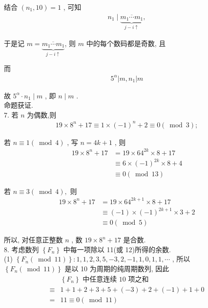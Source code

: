 结合 $\left(n_{1}, 10\right)=1$ , 可知
\begin{align*}
	n_{1} \mid \underbrace{\overline{m_{1} \cdots m_{1}}}_{j-i \uparrow},
\end{align*}

于是记 $m=\underbrace{\overline{m_{1} \cdots m_{1}}}_{j-i \uparrow}$, 则 $m$ 中的每个数码都是奇数, 且

而
\begin{align*}
	5^{\alpha}\left|m, n_{1}\right| m
\end{align*}

故 $5^{\alpha} \cdot n_{1} \mid m$ , 即 $n \mid m$ . \\
命题获证. \\
7. 若 $n$ 为偶数,则
\begin{align*}
	19 \times 8^{n}+17 \equiv 1 \times(-1)^{n}+2 \equiv 0(\bmod 3) ;
\end{align*}

若 $n \equiv 1(\bmod 4)$ , 写 $n=4 k+1$ , 则\begin{align}
	19 \times 8^{n}+17 & =19 \times 64^{2 k} \times 8+17      \\
	                   & \equiv 6 \times(-1)^{2 k} \times 8+4 \\
	                   & \equiv 0(\bmod 13)
\end{align}

若 $n \equiv 3(\bmod 4) , $ 则\begin{align}
	19 \times 8^{n}+17 & =19 \times 64^{2 k+1} \times 8+17        \\
	                   & \equiv(-1) \times(-1)^{2 k+1} \times 3+2 \\
	                   & \equiv 0(\bmod 5)
\end{align}

所以, 对任意正整数 $n$ , 数 $19 \times 8^{n}+17$ 是合数.\\
8. 考虑数列 $\left\{F_{n}\right\}$ 中每一项除以 11(或 12)所得的余数. \\
(1) $\left\{F_{n}(\bmod 11)\right\}: 1,1,2,3,5,-3,2,-1,1,0,1,1, \cdots$ , 所以 $\left\{F_{n}(\bmod 11)\right\}$ 是以 10 为周期的纯周期数列, 因此\begin{align}
	       & \left\{F_{n}\right\} \text { 中任意连续 } 10 \text { 项之和 } \\
	\equiv & 1+1+2+3+5+(-3)+2+(-1)+1+0                                     \\
	=      & 11 \equiv 0(\bmod 11)
\end{align}


